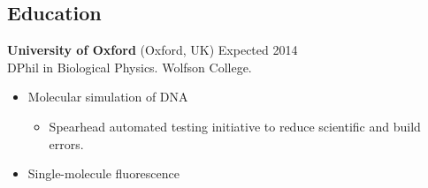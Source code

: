 \documentclass[margin]{res}
\newcommand{\locdatesubsection}[3]{\textbf{#1} (#2) \hfill #3}
\begin{document}
 
\begin{sloppypar}
 
 

\address{2115 Cloville Avenue\\
         Baltimore, MD 21214\\
         \texttt{+}1 443 257 5953}
\address{\texttt{ryan.m.harrison@gmail.com}\\
         \texttt{linkedin.com/in/rmharri}\\
         \texttt{github.com/rmharrison}}
\address{Wolfson College\\ 
         Oxford OX2 6UD\\
         \texttt{+}44 07523 229446}

\begin{resume} 
\setlength{\parskip}{1.00ex}
\setlength{\parindent}{0pt}
 
\section{Education} 
\locdatesubsection{University of Oxford}{Oxford, UK}{Expected 2014}\\
DPhil in Biological Physics. Wolfson College.

\begin{itemize}
\item Molecular simulation of DNA
    \begin{itemize}
    \item Spearhead automated testing initiative to reduce scientific and build errors.
    \end{itemize}
\item Single-molecule fluorescence
\end{itemize}


\end{resume}
\end{sloppypar}
\end{document}
